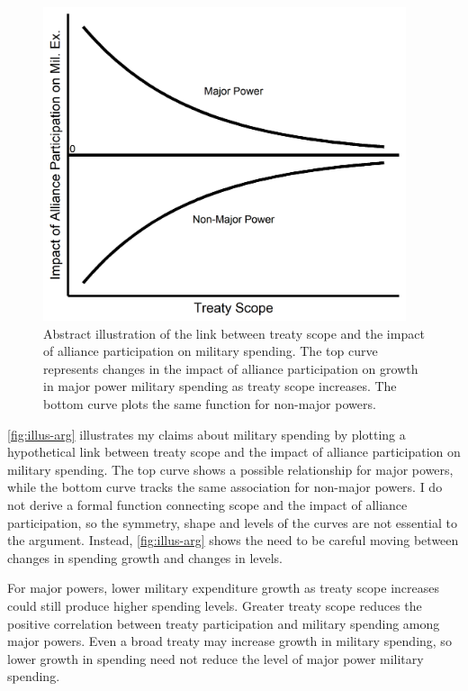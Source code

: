 \documentclass[12pt]{article}
\begin{document}
\begin{figure}[htbp]
	\centering
		\includegraphics[width=0.95\textwidth]{../figures/illus-arg.png}
	\caption{Abstract illustration of the link between treaty scope and the impact of alliance participation on military spending.
	The top curve represents changes in the impact of alliance participation on growth in major power military spending as treaty scope increases.
	The bottom curve plots the same function for non-major powers.}
	\label{fig:illus-arg}
\end{figure}


\autoref{fig:illus-arg} illustrates my claims about military spending by plotting a hypothetical link between treaty scope and the impact of alliance participation on military spending. 
The top curve shows a possible relationship for major powers, while the bottom curve tracks the same association for non-major powers. 
I do not derive a formal function connecting scope and the impact of alliance participation, so the symmetry, shape and levels of the curves are not essential to the argument.
Instead, \autoref{fig:illus-arg} shows the need to be careful moving between changes in spending growth and changes in levels. 


For major powers, lower military expenditure growth as treaty scope increases could still produce higher spending levels. 
Greater treaty scope reduces the positive correlation between treaty participation and military spending among major powers. 
Even a broad treaty may increase growth in military spending, so lower growth in spending need not reduce the level of major power military spending. 
\end{document}
